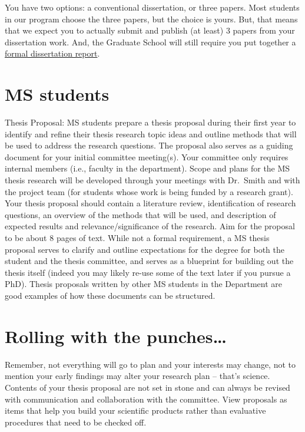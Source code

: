 \documentclass[
  letterpaper,
  DIV=11,
  numbers=noendperiod]{scrreprt}
\begin{document}
You have two options: a conventional dissertation, or three papers. Most
students in our program choose the three papers, but the choice is
yours. But, that means that we expect you to actually submit and publish
(at least) 3 papers from your dissertation work. And, the Graduate
School will still require you put together a
\href{http://graduateschool.ufl.edu/about-us/offices/editorial/format-requirements/}{formal
dissertation report}.

\hypertarget{ms-students}{%
\section{MS students}\label{ms-students}}

Thesis Proposal: MS students prepare a thesis proposal during their
first year to identify and refine their thesis research topic ideas and
outline methods that will be used to address the research questions. The
proposal also serves as a guiding document for your initial committee
meeting(s). Your committee only requires internal members (i.e., faculty
in the department). Scope and plans for the MS thesis research will be
developed through your meetings with Dr.~Smith and with the project team
(for students whose work is being funded by a research grant). Your
thesis proposal should contain a literature review, identification of
research questions, an overview of the methods that will be used, and
description of expected results and relevance/significance of the
research. Aim for the proposal to be about 8 pages of text. While not a
formal requirement, a MS thesis proposal serves to clarify and outline
expectations for the degree for both the student and the thesis
committee, and serves as a blueprint for building out the thesis itself
(indeed you may likely re-use some of the text later if you pursue a
PhD). Thesis proposals written by other MS students in the Department
are good examples of how these documents can be structured.

\hypertarget{rolling-with-the-punches}{%
\section{Rolling with the
punches\ldots{}}\label{rolling-with-the-punches}}

Remember, not everything will go to plan and your interests may change,
not to mention your early findings may alter your research plan --
that's science. Contents of your thesis proposal are not set in stone
and can always be revised with communication and collaboration with the
committee. View proposals as items that help you build your scientific
products rather than evaluative procedures that need to be checked off.
\end{document}
